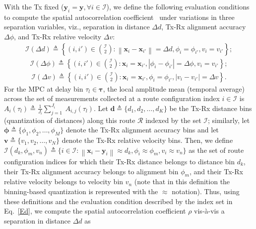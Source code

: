 \documentclass[12pt, draftcls, onecolumn]{IEEEtran}
\newcommand{\abs}[1]{\left\lvert#1\right\rvert}
\newcommand{\norm}[1]{\left\lVert#1\right\rVert}
\begin{document}
{With the Tx fixed ($\mathbf{y}_{i} = \mathbf{y}, \forall i \in \mathcal{I}$), we define the following evaluation conditions to compute the spatial autocorrelation coefficient~\cite{MacCartneySpatialStatistics} under variations in three separation variables, viz., separation in distance $\Delta d$, Tx-Rx alignment accuracy $\Delta \phi$, and Tx-Rx relative velocity $\Delta v$:\clearpage
\begin{align}\label{Ed}
    \mathcal{I}(\Delta d) \triangleq \left\{(i,i') \in \binom{\mathcal{I}}{2}: \norm{\mathbf{x}_{i} - \mathbf{x}_{i'}} = \Delta d, \phi_{i} = \phi_{i'}, v_{i} = v_{i'}\right\};
\end{align}
\begin{align}\label{Ea}
    \mathcal{I}(\Delta \phi) \triangleq \left\{(i,i') \in \binom{\mathcal{I}}{2}: \mathbf{x}_{i} = \mathbf{x}_{i'}, \abs{\phi_{i} - \phi_{i'}} = \Delta \phi, v_{i} = v_{i'}\right\};
\end{align}
\begin{align}\label{Ev}
    \mathcal{I}(\Delta v) \triangleq \left\{(i,i') \in \binom{\mathcal{I}}{2}: \mathbf{x}_{i} = \mathbf{x}_{i'}, \phi_{i} = \phi_{i'}, \abs{v_{i} - v_{i'}} = \Delta v\right\}.
\end{align}
For the MPC at delay bin $\tau_{l} \in \boldsymbol{\tau}$, the local amplitude mean (temporal average) across the set of measurements collected at a route configuration index $i \in \mathcal{I}$ is $A_{i}(\tau_{l}) \triangleq \frac{1}{J_{i}}\sum_{j = 1}^{J_{i}}\ A_{i,j}(\tau_{l})$. Let $\mathbf{d} \triangleq \{d_{1},d_{2},{\dots},d_{K}\}$ be the Tx-Rx distance bins (quantization of distances) along this route $\mathcal{R}$ indexed by the set $\mathcal{I}$; similarly, let $\boldsymbol{\phi} \triangleq \{\phi_{1},\phi_{2},{\dots},\phi_{M}\}$ denote the Tx-Rx alignment accuracy bins and let $\mathbf{v} \triangleq \{v_{1},v_{2},{\dots},v_{N}\}$ denote the Tx-Rx relative velocity bins. Then, we define $\mathcal{I}(d_{k}, \phi_{m}, v_{n}) \triangleq \{i \in \mathcal{I}: \norm{\mathbf{x}_{i} - \mathbf{y}_{i}} \approx d_{k}, \phi_{i} \approx \phi_{m}, v_{i} \approx v_{n}\}$ as the set of route configuration indices for which their Tx-Rx distance belongs to distance bin $d_{k}$, their Tx-Rx alignment accuracy belongs to alignment bin $\phi_{m}$, and their Tx-Rx relative velocity belongs to velocity bin $v_{n}$ (note that in this definition the binning-based quantization is represented with the $\approx$ notation). Thus, using these definitions and the evaluation condition described by the index set in Eq.~\eqref{Ed}, we compute the spatial autocorrelation coefficient $\rho$ vis-à-vis a separation in distance $\Delta d$ as 
}
\end{document}
